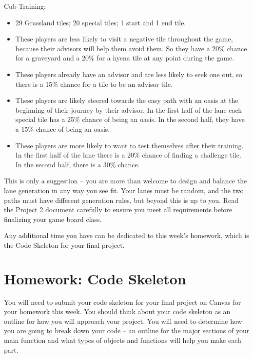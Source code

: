 Cub Training:
\begin{itemize}
    \item 29 Grassland tiles; 20 special tiles; 1 start and 1 end tile.
    \item These players are less likely to visit a negative tile throughout the game, because their advisors will help them avoid them. So they have a 20\% chance for a graveyard and a 20\% for a hyena tile at any point during the game.
    \item These players already have an advisor and are less likely to seek one out, so there is a 15\% chance for a tile to be an advisor tile.
    \item These players are likely steered towards the easy path with an oasis at the beginning of their journey by their advisor. In the first half of the lane each special tile has a 25\% chance of being an oasis. In the second half, they have a 15\% chance of being an oasis.
    \item These players are more likely to want to test themselves after their training. In the first half of the lane there is a 20\% chance of finding a challenge tile. In the second half, there is a 30\% chance. 
\end{itemize}

This is only a suggestion -- you are more than welcome to design and balance the lane generation in any way you see fit. Your lanes must be random, and the two paths must have different generation rules, but beyond this is up to you. Read the Project 2 document carefully to ensure you meet all requirements before finalizing your game board class.

Any additional time you have can be dedicated to this week's homework, which is the Code Skeleton for your final project.


\section{Homework: Code Skeleton}

You will need to submit your code skeleton for your final project on Canvas for your homework this week. You should think about your code skeleton as an outline for how you will approach your project. You will need to determine how you are going to break down your code -- an outline for the major sections of your main function and what types of objects and functions will help you make each part.

